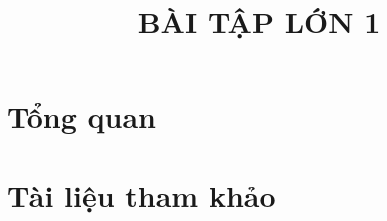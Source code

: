 \documentclass[twoside, final]{hcmut_report}
\title{\LARGE  BÀI TẬP LỚN 1}
\begin{document}
\coverpage
\pagestyle{empty}
\tableofcontents
\pagestyle{fancy}
\pagebreak
\section{Tổng quan}

\section*{Tài liệu tham khảo}




\end{document}
